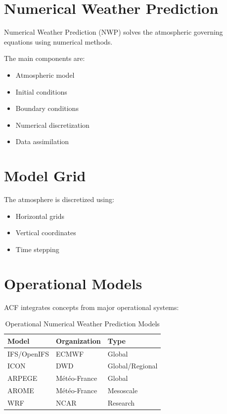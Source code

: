 \section{Numerical Weather Prediction}

Numerical Weather Prediction (NWP) solves the atmospheric
governing equations using numerical methods.

The main components are:

\begin{itemize}
\item Atmospheric model
\item Initial conditions
\item Boundary conditions
\item Numerical discretization
\item Data assimilation
\end{itemize}


\section{Model Grid}

The atmosphere is discretized using:

\begin{itemize}
\item Horizontal grids
\item Vertical coordinates
\item Time stepping
\end{itemize}


\section{Operational Models}

ACF integrates concepts from major operational systems:

\begin{table}[h]
\centering
\begin{tabular}{lll}
\toprule
Model & Organization & Type\\
\midrule
IFS/OpenIFS & ECMWF & Global\\
ICON & DWD & Global/Regional\\
ARPEGE & Météo-France & Global\\
AROME & Météo-France & Mesoscale\\
WRF & NCAR & Research\\
\bottomrule
\end{tabular}
\caption{Operational Numerical Weather Prediction Models}
\end{table}
